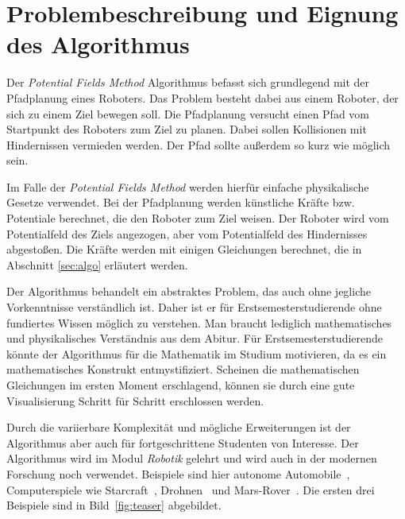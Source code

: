 
\section{Problembeschreibung und Eignung des Algorithmus}\label{sec:intro}

Der \textit{Potential Fields Method} Algorithmus befasst sich grundlegend mit der Pfadplanung eines Roboters. Das Problem besteht dabei aus einem Roboter, der sich zu einem Ziel bewegen soll. Die Pfadplanung versucht einen Pfad vom Startpunkt des Roboters zum Ziel zu planen. Dabei sollen Kollisionen mit Hindernissen vermieden werden. Der Pfad sollte außerdem so kurz wie möglich sein.

Im Falle der \textit{Potential Fields Method} werden hierfür einfache physikalische Gesetze verwendet. Bei der Pfadplanung werden künstliche Kräfte bzw. Potentiale berechnet, die den Roboter zum Ziel weisen. Der Roboter wird vom Potentialfeld des Ziels angezogen, aber vom Potentialfeld des Hindernisses abgestoßen. Die Kräfte werden mit einigen Gleichungen berechnet, die in Abschnitt \vref{sec:algo} erläutert werden.

Der Algorithmus behandelt ein abstraktes Problem, das auch ohne jegliche Vorkenntnisse verständlich ist. Daher ist er für Erstsemesterstudierende ohne fundiertes Wissen möglich zu verstehen. Man braucht lediglich mathematisches und physikalisches Verständnis aus dem Abitur. 
Für Erstsemesterstudierende könnte der Algorithmus für die Mathematik im Studium motivieren, da es ein mathematisches Konstrukt entmystifiziert. Scheinen die mathematischen Gleichungen im ersten Moment erschlagend, können sie durch eine gute Visualisierung Schritt für Schritt erschlossen werden. 

Durch die variierbare Komplexität und mögliche Erweiterungen ist der Algorithmus aber auch für fortgeschrittene Studenten von Interesse. 
Der Algorithmus wird im Modul \textit{Robotik} gelehrt und wird auch in der modernen Forschung noch verwendet. Beispiele sind hier autonome Automobile~\cite{dolgov2009path}, Computerspiele wie Starcraft~\cite{hagelback2012potential}, Drohnen~\cite{paul2008modelling} und Mars-Rover~\cite{massari2004autonomous}. Die ersten drei Beispiele sind in Bild~\vref{fig:teaser} abgebildet.


